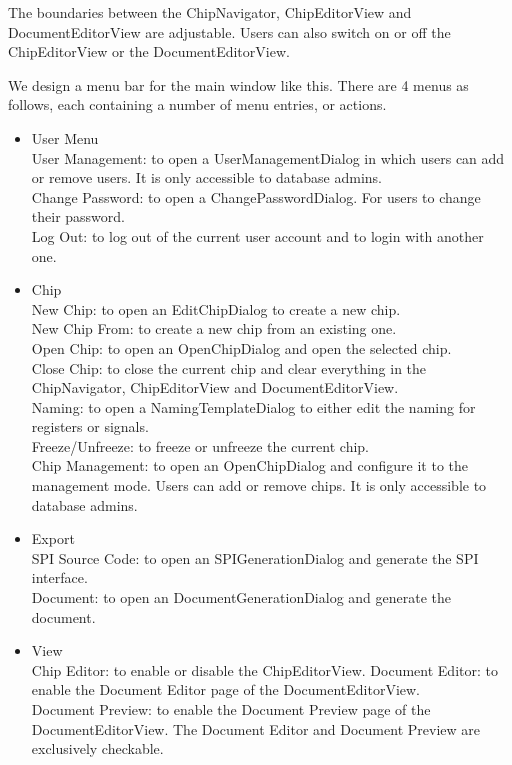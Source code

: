 The boundaries between the ChipNavigator, ChipEditorView and DocumentEditorView are adjustable. Users can also switch on or off the ChipEditorView or the DocumentEditorView. 

We design a menu bar for the main window like this. There are 4 menus as follows, each containing a number of menu entries, or actions.
\begin{itemize}
\item User Menu \\
User Management: to open a UserManagementDialog in which users can add or remove users. It is only accessible to database admins. \\
Change Password: to open a ChangePasswordDialog. For users to change their password. \\
Log Out: to log out of the current user account and to login with another one. 
\item Chip \\
New Chip: to open an EditChipDialog to create a new chip. \\
New Chip From: to create a new chip from an existing one. \\
Open Chip: to open an OpenChipDialog and open the selected chip. \\
Close Chip: to close the current chip and clear everything in the ChipNavigator, ChipEditorView and DocumentEditorView. \\
Naming: to open a NamingTemplateDialog to either edit the naming for registers or signals. \\
Freeze/Unfreeze: to freeze or unfreeze the current chip. \\
Chip Management: to open an OpenChipDialog and configure it to the management mode. Users can add or remove chips. It is only accessible to database admins. 
\item Export \\
SPI Source Code: to open an SPIGenerationDialog and generate the SPI interface. \\
Document: to open an DocumentGenerationDialog and generate the document. 
\item View \\
Chip Editor: to enable or disable the ChipEditorView. 
Document Editor: to enable the Document Editor page of the DocumentEditorView. \\
Document Preview: to enable the Document Preview page of the DocumentEditorView. The Document Editor and Document Preview are exclusively checkable. 
\end{itemize}

